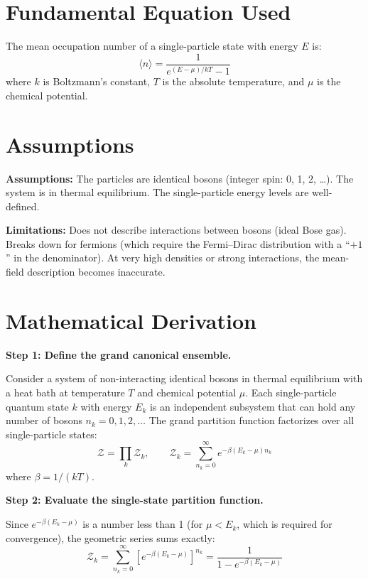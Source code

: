 \documentclass[11pt,openright]{book}
\begin{document}
\section*{Fundamental Equation Used}

The mean occupation number of a single-particle state with energy $E$ is:
\[
\langle n \rangle = \frac{1}{e^{(E - \mu)/kT} - 1}
\]
where $k$ is Boltzmann's constant, $T$ is the absolute temperature, and $\mu$ is the chemical potential.
\section*{Assumptions}

\textbf{Assumptions:} The particles are identical bosons (integer spin: 0, 1, 2, \ldots). The system is in thermal equilibrium. The single-particle energy levels are well-defined.


\textbf{Limitations:} Does not describe interactions between bosons (ideal Bose gas). Breaks down for fermions (which require the Fermi--Dirac distribution with a ``$+1$'' in the denominator). At very high densities or strong interactions, the mean-field description becomes inaccurate.


\section*{Mathematical Derivation}

\textbf{Step 1: Define the grand canonical ensemble.}

Consider a system of non-interacting identical bosons in thermal equilibrium with a heat bath at temperature $T$ and chemical potential $\mu$. Each single-particle quantum state $k$ with energy $E_k$ is an independent subsystem that can hold any number of bosons $n_k = 0, 1, 2, \ldots$ The grand partition function factorizes over all single-particle states:
\begin{equation}
\mathcal{Z} = \prod_k \mathcal{Z}_k, \qquad \mathcal{Z}_k = \sum_{n_k=0}^{\infty} e^{-\beta(E_k - \mu)n_k}
\end{equation}
where $\beta = 1/(kT)$.

\textbf{Step 2: Evaluate the single-state partition function.}

Since $e^{-\beta(E_k - \mu)}$ is a number less than 1 (for $\mu < E_k$, which is required for convergence), the geometric series sums exactly:
\begin{equation}
\mathcal{Z}_k = \sum_{n_k=0}^{\infty} \left[e^{-\beta(E_k - \mu)}\right]^{n_k} = \frac{1}{1 - e^{-\beta(E_k - \mu)}}
\end{equation}
\end{document}
